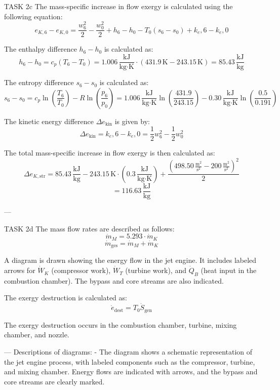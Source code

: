 TASK 2c  
The mass-specific increase in flow exergy is calculated using the following equation:  
\[
e_{K,6} - e_{K,0} = \frac{w_6^2}{2} - \frac{w_0^2}{2} + h_6 - h_0 - T_0(s_6 - s_0) + k_e,6 - k_e,0
\]  

The enthalpy difference \( h_6 - h_0 \) is calculated as:  
\[
h_6 - h_0 = c_p(T_6 - T_0) = 1.006 \, \frac{\text{kJ}}{\text{kg·K}} \cdot (431.9 \, \text{K} - 243.15 \, \text{K}) = 85.43 \, \frac{\text{kJ}}{\text{kg}}
\]  

The entropy difference \( s_6 - s_0 \) is calculated as:  
\[
s_6 - s_0 = c_p \ln\left(\frac{T_6}{T_0}\right) - R \ln\left(\frac{p_6}{p_0}\right) = 1.006 \, \frac{\text{kJ}}{\text{kg·K}} \ln\left(\frac{431.9}{243.15}\right) - 0.30 \, \frac{\text{kJ}}{\text{kg·K}} \ln\left(\frac{0.5}{0.191}\right)
\]  

The kinetic energy difference \( \Delta e_{\text{kin}} \) is given by:  
\[
\Delta e_{\text{kin}} = k_e,6 - k_e,0 = \frac{1}{2} w_6^2 - \frac{1}{2} w_0^2
\]  

The total mass-specific increase in flow exergy is then calculated as:  
\[
\Delta e_{K,\text{str}} = 85.43 \, \frac{\text{kJ}}{\text{kg}} - 243.15 \, \text{K} \cdot (0.3 \, \frac{\text{kJ}}{\text{kg·K}}) + \frac{(498.50 \, \frac{\text{m}^2}{\text{s}^2} - 200 \, \frac{\text{m}^2}{\text{s}^2})^2}{2}
\]  
\[
= 116.63 \, \frac{\text{kJ}}{\text{kg}}
\]  

---

TASK 2d  
The mass flow rates are described as follows:  
\[
\dot{m}_M = 5.293 \cdot \dot{m}_K
\]  
\[
\dot{m}_{\text{ges}} = \dot{m}_M + \dot{m}_K
\]  

A diagram is drawn showing the energy flow in the jet engine. It includes labeled arrows for \( \dot{W}_K \) (compressor work), \( \dot{W}_T \) (turbine work), and \( \dot{Q}_B \) (heat input in the combustion chamber). The bypass and core streams are also indicated.  

The exergy destruction is calculated as:  
\[
\dot{e}_{\text{dest}} = T_0 \dot{S}_{\text{gen}}
\]  

The exergy destruction occurs in the combustion chamber, turbine, mixing chamber, and nozzle.  

---  
Descriptions of diagrams:  
- The diagram shows a schematic representation of the jet engine process, with labeled components such as the compressor, turbine, and mixing chamber. Energy flows are indicated with arrows, and the bypass and core streams are clearly marked.  

